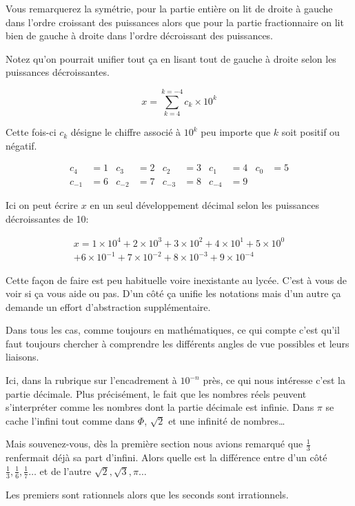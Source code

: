 \documentclass[a4paper, 11pt, twoside]{article}
\begin{document}
Vous remarquerez la symétrie, pour la partie entière on lit de
droite à gauche dans l'ordre croissant des puissances alors que pour
la partie fractionnaire on lit bien de gauche à droite dans
l'ordre décroissant des puissances.


Notez qu'on pourrait unifier tout ça en lisant tout de gauche à
droite selon les puissances décroissantes.

\[x = \sum_{k = 4}^{k = -4}c_k\times 10^k\]

Cette fois-ci \(c_k\) désigne le chiffre associé à \(10^k\) peu importe
que \(k\) soit positif ou négatif.

\begin{align*}
c_4 &= 1 & c_3 &= 2 & c_2 &= 3 & c_1 &= 4 & c_0 &= 5\\
c_{-1} &= 6 & c_{-2} &= 7 & c_{-3} &= 8 & c_{-4} &= 9
\end{align*}

Ici on peut écrire \(x\) en un seul développement décimal selon les
puissances décroissantes de 10:

\begin{multline}
x = 1\times 10^4 + 2\times 10^3 + 3\times 10^2 + 4\times 10^1 + 5\times 10^0 \\
+ 6\times 10^{-1} + 7\times 10^{-2} + 8\times 10^{-3} + 9\times 10^{-4}
\end{multline}

Cette façon de faire est peu habituelle voire inexistante au
lycée. C'est à vous de voir si ça vous aide ou pas. D'un côté ça
unifie les notations mais d'un autre ça demande un effort
d'abstraction supplémentaire.

Dans tous les cas, comme toujours en mathématiques, ce qui compte
c'est qu'il faut toujours chercher à comprendre les différents
angles de vue possibles et leurs liaisons.

Ici, dans la rubrique sur l'encadrement à \(10^{-n}\) près, ce qui
nous intéresse c'est la partie décimale. Plus précisément, le fait
que les nombres réels peuvent s'interpréter comme les nombres dont
la partie décimale est infinie. Dans \(\pi\) se cache l'infini tout
comme dans \(\Phi\), \(\sqrt{2}\) et une infinité de nombres\ldots{}

Mais souvenez-vous, dès la première section nous avions remarqué
que \(\frac{1}{3}\) renfermait déjà sa part d'infini. Alors quelle
est la différence entre d'un côté \(\frac{1}{3}, \frac{1}{6},
    \frac{1}{7}\dots\) et de l'autre \(\sqrt{2}, \sqrt{3}, \pi\dots\)

Les premiers sont rationnels alors que les seconds sont irrationnels.
\stopcontents[level-2]
\end{document}
